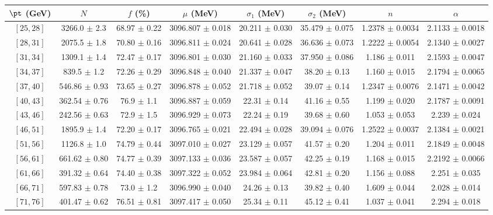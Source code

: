 \begin{tabular}{c||c|c|c|c|c|c|c}
$\pt$ (GeV) & $N$ & $f$ (\%) & $\mu$ (MeV) & $\sigma_1$ (MeV) & $\sigma_2$ (MeV) & $n$ & $\alpha$ \\
\hline
$[25, 28]$ & 3266.0 $\pm$ 2.3 & 68.97 $\pm$ 0.22 & 3096.807 $\pm$ 0.018 & 20.211 $\pm$ 0.030 & 35.479 $\pm$ 0.075 & 1.2378 $\pm$ 0.0034 & 2.1133 $\pm$ 0.0018\\
$[28, 31]$ & 2075.5 $\pm$ 1.8 & 70.80 $\pm$ 0.16 & 3096.811 $\pm$ 0.024 & 20.641 $\pm$ 0.028 & 36.636 $\pm$ 0.073 & 1.2222 $\pm$ 0.0054 & 2.1340 $\pm$ 0.0027\\
$[31, 34]$ & 1309.1 $\pm$ 1.4 & 72.47 $\pm$ 0.17 & 3096.801 $\pm$ 0.030 & 21.160 $\pm$ 0.033 & 37.950 $\pm$ 0.086 & 1.186 $\pm$ 0.011 & 2.1593 $\pm$ 0.0047\\
$[34, 37]$ & 839.5 $\pm$ 1.2 & 72.26 $\pm$ 0.29 & 3096.848 $\pm$ 0.040 & 21.337 $\pm$ 0.047 & 38.20 $\pm$ 0.13 & 1.160 $\pm$ 0.015 & 2.1794 $\pm$ 0.0065\\
$[37, 40]$ & 546.86 $\pm$ 0.93 & 73.65 $\pm$ 0.27 & 3096.878 $\pm$ 0.052 & 21.718 $\pm$ 0.052 & 39.07 $\pm$ 0.14 & 1.2347 $\pm$ 0.0076 & 2.1471 $\pm$ 0.0042\\
$[40, 43]$ & 362.54 $\pm$ 0.76 & 76.9 $\pm$ 1.1 & 3096.887 $\pm$ 0.059 & 22.31 $\pm$ 0.14 & 41.16 $\pm$ 0.55 & 1.199 $\pm$ 0.020 & 2.1787 $\pm$ 0.0091\\
$[43, 46]$ & 242.56 $\pm$ 0.63 & 72.9 $\pm$ 1.5 & 3096.929 $\pm$ 0.073 & 22.24 $\pm$ 0.19 & 39.68 $\pm$ 0.60 & 1.053 $\pm$ 0.053 & 2.239 $\pm$ 0.024\\
$[46, 51]$ & 1895.9 $\pm$ 1.4 & 72.20 $\pm$ 0.17 & 3096.765 $\pm$ 0.021 & 22.494 $\pm$ 0.028 & 39.094 $\pm$ 0.076 & 1.2522 $\pm$ 0.0037 & 2.1384 $\pm$ 0.0021\\
$[51, 56]$ & 1126.8 $\pm$ 1.0 & 74.79 $\pm$ 0.44 & 3097.010 $\pm$ 0.027 & 23.129 $\pm$ 0.057 & 41.57 $\pm$ 0.20 & 1.204 $\pm$ 0.011 & 2.1849 $\pm$ 0.0048\\
$[56, 61]$ & 661.62 $\pm$ 0.80 & 74.77 $\pm$ 0.39 & 3097.133 $\pm$ 0.036 & 23.587 $\pm$ 0.057 & 42.25 $\pm$ 0.19 & 1.168 $\pm$ 0.015 & 2.2192 $\pm$ 0.0066\\
$[61, 66]$ & 391.32 $\pm$ 0.64 & 74.40 $\pm$ 0.38 & 3097.322 $\pm$ 0.052 & 23.984 $\pm$ 0.064 & 42.81 $\pm$ 0.20 & 1.156 $\pm$ 0.088 & 2.251 $\pm$ 0.035\\
$[66, 71]$ & 597.83 $\pm$ 0.78 & 73.0 $\pm$ 1.2 & 3096.990 $\pm$ 0.040 & 24.26 $\pm$ 0.13 & 39.82 $\pm$ 0.40 & 1.609 $\pm$ 0.044 & 2.028 $\pm$ 0.014\\
$[71, 76]$ & 401.47 $\pm$ 0.62 & 76.51 $\pm$ 0.81 & 3097.417 $\pm$ 0.050 & 25.34 $\pm$ 0.11 & 45.12 $\pm$ 0.41 & 1.037 $\pm$ 0.041 & 2.294 $\pm$ 0.018\\

\end{tabular}
